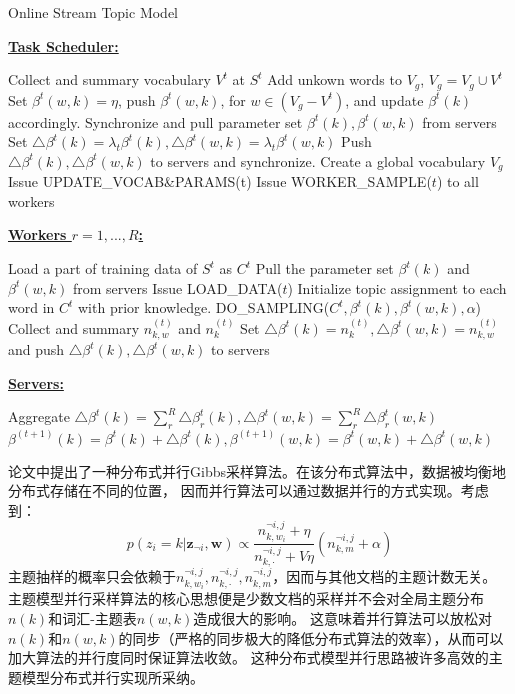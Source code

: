 \begin{algorithm}[]
\caption{Online Stream Topic Model}
\label{alg:onlineStreamLDA}
\textbf{\underline{Task Scheduler:}}
\begin{algorithmic}[1]
\State Collect and summary vocabulary $V^t$ at $S^t$
\State Add unkown words to $V_g$, $V_g = V_g \cup V^t$
\State Set $\beta^t(w, k) = \eta$, push $\beta^t(w, k)$, for $w \in (V_g - V^t)$, and update $\beta^t(k)$ accordingly.
\State Synchronize and pull parameter set $\beta^t(k), \beta^t(w, k)$ from servers
\State Set $\bigtriangleup \beta^t(k) = \lambda_t \beta^t(k), \bigtriangleup \beta^t(w, k) = \lambda_t \beta^t(w, k)$
\State Push $\bigtriangleup \beta^t(k), \bigtriangleup \beta^t(w, k)$  to servers and synchronize.
\EndFunction
\State Create a global vocabulary $V_g$
\State Issue UPDATE\_VOCAB\&PARAMS(t)
\State Issue WORKER\_SAMPLE($t$) to all workers
\EndFor
\end{algorithmic}
\textbf{\underline{Workers $r = 1, ..., R$:}}
\begin{algorithmic}[1]
\State Load a part of training data of $S^t$ as $C^t$
\State Pull the parameter set $\beta^t(k)$ and $\beta^t(w, k)$ from servers
\EndFunction
{}
\State Issue LOAD\_DATA($t$)
\State Initialize topic assignment to each word in $C^t$ with prior knowledge.
\State DO\_SAMPLING($C^t, \beta^t(k), \beta^t(w, k), \alpha$)
\EndFor
\State Collect and summary $n_{k,w}^{(t)}$ and $n_{k}^{(t)}$
\State Set $\bigtriangleup \beta^t(k) = n_{k}^{(t)}, \bigtriangleup \beta^t(w, k) = n_{k,w}^{(t)}$ and push $\bigtriangleup \beta^t(k), \bigtriangleup \beta^t(w, k)$ to servers
\EndFunction
\end{algorithmic}  
\textbf{\underline{Servers:}}
\begin{algorithmic}[1]
\State Aggregate $\bigtriangleup \beta^t(k) = \sum_r^R{\bigtriangleup \beta^t_r(k)}, \bigtriangleup \beta^t(w, k) = \sum_r^R{\bigtriangleup \beta^t_r(w, k)}$
\State $\beta^{(t+1)}(k) =\beta^t(k) +  \bigtriangleup \beta^t(k), \beta^{(t+1)}(w, k) = \beta^t(w, k) + \bigtriangleup \beta^t(w, k)$
\EndFunction
\end{algorithmic}
\end{algorithm}  

论文\cite{smola2010an}中提出了一种分布式并行Gibbs采样算法。在该分布式算法中，数据被均衡地分布式存储在不同的位置，
因而并行算法可以通过数据并行的方式实现。考虑到：
\begin{equation}
p( z_i = k | \mathbf{z}_{\neg i},  \mathbf{w}) 
 \propto \dfrac{ n_{k, w_i}^{\neg i,j} + \eta }{ n_{k, \cdot}^{\neg i,j} + V\eta}
(n_{k, m}^{\neg i,j} + \alpha)
\label{eq:sample-prob}
\end{equation}
主题抽样的概率只会依赖于$n_{k, w_i}^{\neg i,j}, n_{k, \cdot}^{\neg i,j}, n_{k, m}^{\neg i,j}$，因而与其他文档的主题计数无关。
主题模型并行采样算法的核心思想便是少数文档的采样并不会对全局主题分布$n(k)$和词汇-主题表$n(w, k)$造成很大的影响。
这意味着并行算法可以放松对$n(k)$和$n(w, k)$的同步（严格的同步极大的降低分布式算法的效率），从而可以加大算法的并行度同时保证算法收敛。
这种分布式模型并行思路被许多高效的主题模型分布式并行实现所采纳。

